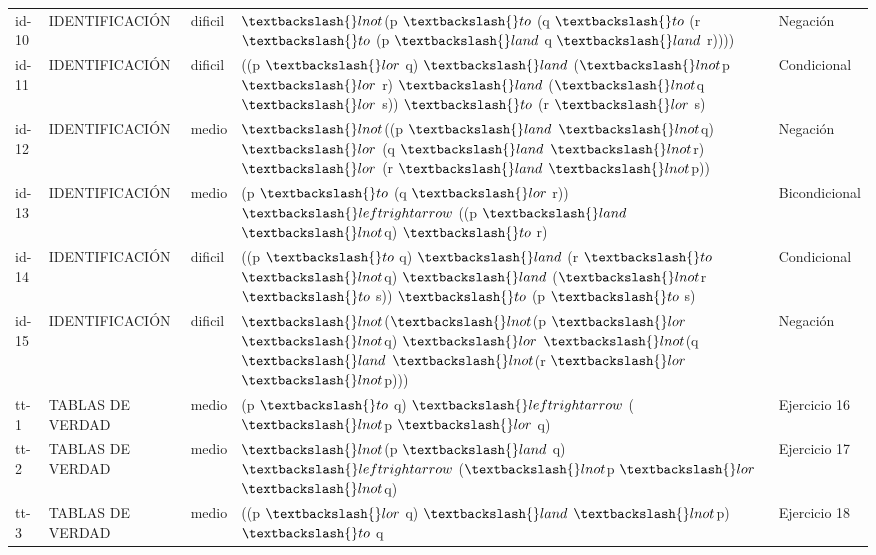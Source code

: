 \documentclass[11pt,a4paper,openany]{book}
\begin{document}
\begin{center}
\begin{longtable}{lllll}
id-10 & IDENTIFICACIÓN & dificil & $ \textbackslash\{\}lnot $(p $ \textbackslash\{\}to $ (q $ \textbackslash\{\}to $ (r $ \textbackslash\{\}to $ (p $ \textbackslash\{\}land $ q $ \textbackslash\{\}land $ r)))) & Negación \\
id-11 & IDENTIFICACIÓN & dificil & ((p $ \textbackslash\{\}lor $ q) $ \textbackslash\{\}land $ ($ \textbackslash\{\}lnot $p $ \textbackslash\{\}lor $ r) $ \textbackslash\{\}land $ ($ \textbackslash\{\}lnot $q $ \textbackslash\{\}lor $ s)) $ \textbackslash\{\}to $ (r $ \textbackslash\{\}lor $ s) & Condicional \\
id-12 & IDENTIFICACIÓN & medio & $ \textbackslash\{\}lnot $((p $ \textbackslash\{\}land $ $ \textbackslash\{\}lnot $q) $ \textbackslash\{\}lor $ (q $ \textbackslash\{\}land $ $ \textbackslash\{\}lnot $r) $ \textbackslash\{\}lor $ (r $ \textbackslash\{\}land $ $ \textbackslash\{\}lnot $p)) & Negación \\
id-13 & IDENTIFICACIÓN & medio & (p $ \textbackslash\{\}to $ (q $ \textbackslash\{\}lor $ r)) $ \textbackslash\{\}leftrightarrow $ ((p $ \textbackslash\{\}land $ $ \textbackslash\{\}lnot $q) $ \textbackslash\{\}to $ r) & Bicondicional \\
id-14 & IDENTIFICACIÓN & dificil & ((p $ \textbackslash\{\}to $ q) $ \textbackslash\{\}land $ (r $ \textbackslash\{\}to $ $ \textbackslash\{\}lnot $q) $ \textbackslash\{\}land $ ($ \textbackslash\{\}lnot $r $ \textbackslash\{\}to $ s)) $ \textbackslash\{\}to $ (p $ \textbackslash\{\}to $ s) & Condicional \\
id-15 & IDENTIFICACIÓN & dificil & $ \textbackslash\{\}lnot $($ \textbackslash\{\}lnot $(p $ \textbackslash\{\}lor $ $ \textbackslash\{\}lnot $q) $ \textbackslash\{\}lor $ $ \textbackslash\{\}lnot $(q $ \textbackslash\{\}land $ $ \textbackslash\{\}lnot $(r $ \textbackslash\{\}lor $ $ \textbackslash\{\}lnot $p))) & Negación \\
tt-1 & TABLAS DE VERDAD & medio & (p $ \textbackslash\{\}to $ q) $ \textbackslash\{\}leftrightarrow $ ($ \textbackslash\{\}lnot $p $ \textbackslash\{\}lor $ q) & Ejercicio 16 \\
tt-2 & TABLAS DE VERDAD & medio & $ \textbackslash\{\}lnot $(p $ \textbackslash\{\}land $ q) $ \textbackslash\{\}leftrightarrow $ ($ \textbackslash\{\}lnot $p $ \textbackslash\{\}lor $ $ \textbackslash\{\}lnot $q) & Ejercicio 17 \\
tt-3 & TABLAS DE VERDAD & medio & ((p $ \textbackslash\{\}lor $ q) $ \textbackslash\{\}land $ $ \textbackslash\{\}lnot $p) $ \textbackslash\{\}to $ q & Ejercicio 18 \\

\end{longtable}
\end{center}
\end{document}
